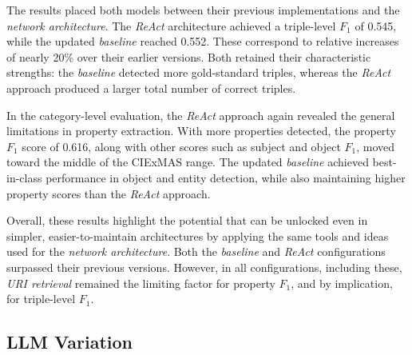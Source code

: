 \documentclass[a4paper,oneside,bibliography=totoc]{scrbook}
\begin{document}
The results placed both models between their previous implementations and the \textit{network architecture}. The \textit{\ac{ReAct}} architecture achieved a triple-level $F_{1}$ of 0.545, while the updated \textit{baseline} reached 0.552. These correspond to relative increases of nearly 20\% over their earlier versions. Both retained their characteristic strengths: the \textit{baseline} detected more gold-standard triples, whereas the \textit{\ac{ReAct}} approach produced a larger total number of correct triples.

In the category-level evaluation, the \textit{\ac{ReAct}} approach again revealed the general limitations in property extraction. With more properties detected, the property $F_{1}$ score of 0.616, along with other scores such as subject and object $F_{1}$, moved toward the middle of the CIExMAS range. The updated \textit{baseline} achieved best-in-class performance in object and entity detection, while also maintaining higher property scores than the \textit{\ac{ReAct}} approach.

Overall, these results highlight the potential that can be unlocked even in simpler, easier-to-maintain architectures by applying the same tools and ideas used for the \textit{network architecture}. Both the \textit{baseline} and \textit{\ac{ReAct}} configurations surpassed their previous versions. However, in all configurations, including these, \textit{\ac{URI} retrieval} remained the limiting factor for property $F_{1}$, and by implication, for triple-level $F_{1}$.


\subsection{LLM Variation}
\label{subsec:llm_model_variation}
\end{document}
